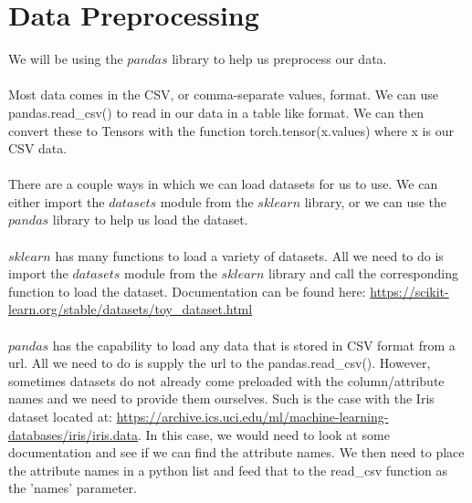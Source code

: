 \documentclass{report}
\begin{document}
\section{Data Preprocessing}

\noindent We will be using the $pandas$ library to help us preprocess our data. 
\\

\\

Most data comes in the CSV, or comma-separate values, format. We can use 
pandas.read\_csv() to read in our data in a table like format. We can then convert these to Tensors with the function torch.tensor(x.values) where x is our CSV data. 
\\

\\

There are a couple ways in which we can load datasets for us to use. We can either import the $datasets$ module from the $sklearn$ library, or we can use the $pandas$ library to help us load the dataset. 
\\

\\

$sklearn$ has many functions to load a variety of datasets. All we need to do is import the $datasets$ module from the $sklearn$ library and call the corresponding function to load the dataset. Documentation can be found here: \url{https://scikit-learn.org/stable/datasets/toy_dataset.html}
\\

\\

$pandas$ has the capability to load any data that is stored in CSV format from a url. All we need to do is supply the url to the pandas.read\_csv(). However, sometimes datasets do not already come preloaded with the column/attribute names and we need to provide them ourselves. Such is the case with the Iris dataset located at: \url{https://archive.ics.uci.edu/ml/machine-learning-databases/iris/iris.data}. In this case, we would need to look at some documentation and see if we can find the attribute names. We then need to place the attribute names in a python list and feed that to the read\_csv function as the 'names' parameter. 
\end{document}
